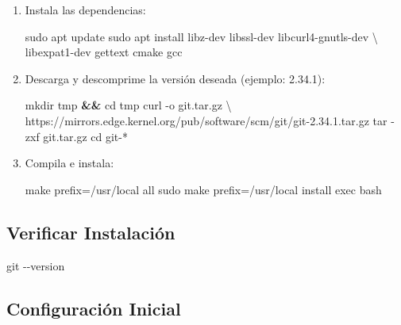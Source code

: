 \documentclass[
  doc,
  floatsintext,
  longtable,
  a4paper,
  nolmodern,
  notxfonts,
  notimes,
  12pt,
  colorlinks=true,linkcolor=blue,citecolor=blue,urlcolor=blue]{apa7}
\newenvironment{Shaded}{\begin{snugshade}}{\end{snugshade}}
\newcommand{\AttributeTok}[1]{\textcolor[rgb]{0.40,0.45,0.13}{#1}}
\newcommand{\BuiltInTok}[1]{\textcolor[rgb]{0.00,0.23,0.31}{#1}}
\newcommand{\DataTypeTok}[1]{\textcolor[rgb]{0.68,0.00,0.00}{#1}}
\newcommand{\ExtensionTok}[1]{\textcolor[rgb]{0.00,0.23,0.31}{#1}}
\newcommand{\FunctionTok}[1]{\textcolor[rgb]{0.28,0.35,0.67}{#1}}
\newcommand{\KeywordTok}[1]{\textcolor[rgb]{0.00,0.23,0.31}{\textbf{#1}}}
\newcommand{\NormalTok}[1]{\textcolor[rgb]{0.00,0.23,0.31}{#1}}
\newcommand{\PreprocessorTok}[1]{\textcolor[rgb]{0.68,0.00,0.00}{#1}}
\begin{document}
\begin{enumerate}
\def\labelenumi{\arabic{enumi}.}
\item
  Instala las dependencias:

\begin{Shaded}
\begin{Highlighting}[]
\FunctionTok{sudo}\NormalTok{ apt update}
\FunctionTok{sudo}\NormalTok{ apt install libz{-}dev libssl{-}dev libcurl4{-}gnutls{-}dev }\DataTypeTok{\textbackslash{}}
\NormalTok{libexpat1{-}dev gettext cmake gcc}
\end{Highlighting}
\end{Shaded}
\item
  Descarga y descomprime la versión deseada (ejemplo: 2.34.1):

\begin{Shaded}
\begin{Highlighting}[]
\FunctionTok{mkdir}\NormalTok{ tmp }\KeywordTok{\&\&} \BuiltInTok{cd}\NormalTok{ tmp}
\ExtensionTok{curl} \AttributeTok{{-}o}\NormalTok{ git.tar.gz }\DataTypeTok{\textbackslash{}}
\NormalTok{https://mirrors.edge.kernel.org/pub/software/scm/git/git{-}2.34.1.tar.gz}
\FunctionTok{tar} \AttributeTok{{-}zxf}\NormalTok{ git.tar.gz}
\BuiltInTok{cd}\NormalTok{ git{-}}\PreprocessorTok{*}
\end{Highlighting}
\end{Shaded}
\item
  Compila e instala:

\begin{Shaded}
\begin{Highlighting}[]
\FunctionTok{make}\NormalTok{ prefix=/usr/local all}
\FunctionTok{sudo}\NormalTok{ make prefix=/usr/local install}
\BuiltInTok{exec}\NormalTok{ bash}
\end{Highlighting}
\end{Shaded}
\end{enumerate}

\subsection{Verificar Instalación}\label{verificar-instalaciuxf3n}

\begin{Shaded}
\begin{Highlighting}[]
\FunctionTok{git} \AttributeTok{{-}{-}version}
\end{Highlighting}
\end{Shaded}

\subsection{Configuración Inicial}\label{configuraciuxf3n-inicial}
\end{document}
